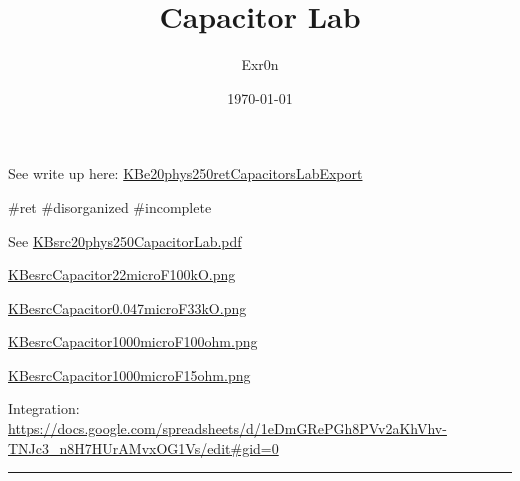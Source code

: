 \documentclass[letterpaper]{article}
\author{Exr0n}
\date{\today}
\title{Capacitor Lab}
\renewcommand\maketitle{}
\begin{document}
\maketitle
See write up here:
\href{KBe20phys250retCapacitorsLabExport.org}{KBe20phys250retCapacitorsLabExport}

\#ret \#disorganized \#incomplete

See
\href{KBsrc20phys250CapacitorLab.pdf.org}{KBsrc20phys250CapacitorLab.pdf}

\href{KBesrcCapacitor22microF100kO.png.org}{KBesrcCapacitor22microF100kO.png}

\href{KBesrcCapacitor0.047microF33kO.png.org}{KBesrcCapacitor0.047microF33kO.png}

\href{KBesrcCapacitor1000microF100ohm.png.org}{KBesrcCapacitor1000microF100ohm.png}

\href{KBesrcCapacitor1000microF15ohm.png.org}{KBesrcCapacitor1000microF15ohm.png}

Integration:
\url{https://docs.google.com/spreadsheets/d/1eDmGRePGh8PVv2aKhVhv-TNJc3\_n8H7HUrAMvxOG1Vs/edit\#gid=0}

\noindent\rule{\textwidth}{0.5pt}
\end{document}
